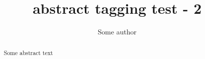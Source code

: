 \documentclass{article}
\title{abstract tagging test - 2}
\author{Some author}
\begin{document}
\begin{abstract}
Some abstract text
\end{abstract}

\tableofcontents
\end{document}
